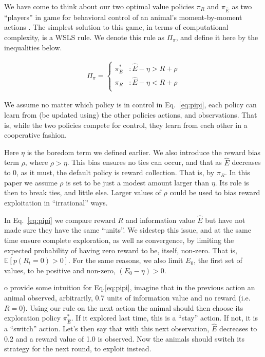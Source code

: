 We have come to think about our two optimal value policies $\pi_R$ and $\pi_{\hat E}$ as two ``players'' in game for behavioral control of an animal's moment-by-moment actions \cite{Estes1994TowardAS}. The simplest solution to this game, in terms of computational complexity, is a WSLS rule. We denote this rule as $\Pi_\pi$, and define it here by the inequalities below. 

\begin{equation} 
    \label{eq:pipi}
    \begin{split}
        \Pi_{\pi} = 
        \begin{cases}
            \pi^*_{\hat{E}} & : \hat{E} - \eta > R + \rho \\
            \pi_R 	& : \hat{E} - \eta < R + \rho \\
        \end{cases}
    \end{split}
\end{equation}

We assume no matter which policy is in control in Eq.~\ref{eq:pipi}, each policy can learn from (be updated using) the other policies actions, and observations. That is, while the two policies compete for control, they learn from each other in a cooperative fashion.

Here $\eta$ is the boredom term we defined earlier. We also introduce the reward bias term $\rho$, where $\rho > \eta$. This bias ensures no ties can occur, and that as $\hat E$ decreases to 0, as it must, the default policy is reward collection. That is, by $\pi_R$. In this paper we assume $\rho$ is set to be just a modest amount larger than $\eta$. Its role is then to break ties, and little else. Larger values of $\rho$ could be used to bias reward  exploitation in ``irrational'' ways.

In Eq.~\ref{eq:pipi} we compare reward $R$ and information value $\hat E$ but have not made sure they have the same ``units''. We sidestep this issue, and at the same time ensure complete exploration, as well as convergence, by limiting the expected probability of having zero reward to be, itself, non-zero. That is, $\mathbb{E}[p(R_t=0) > 0]$. For the same reasons, we also limit $E_0$, the first set of values, to be positive and non-zero, $(E_0 - \eta) > 0$. 

o provide some intuition for Eq.\ref{eq:pipi}, imagine that in the previous action an animal observed, arbitrarily, 0.7 units of information value and no reward (i.e. $R = 0$). Using our rule on the next action the animal should then choose its exploration policy $\pi^*_{\hat{E}}$. If it explored last time, this is a ``stay'' action. If not, it is a ``switch'' action. Let's then say that with this next observation, $\hat E$ decreases to 0.2 and a reward value of 1.0 is observed. Now the animals should switch its strategy for the next round, to exploit instead.


